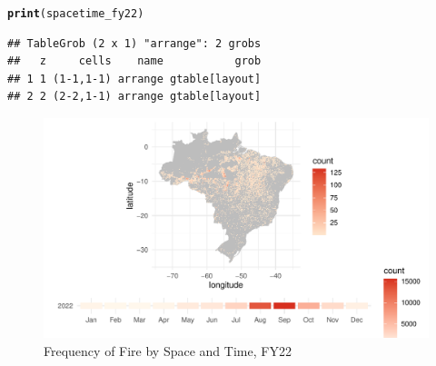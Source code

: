 \documentclass{article}\usepackage[]{graphicx}\usepackage[]{xcolor}
\makeatletter
\def\maxwidth{ %
  \ifdim\Gin@nat@width>\linewidth
    \linewidth
  \else
    \Gin@nat@width
  \fi
}
\newcommand{\hlstd}[1]{\textcolor[rgb]{0.345,0.345,0.345}{#1}}%
\newcommand{\hlkwd}[1]{\textcolor[rgb]{0.737,0.353,0.396}{\textbf{#1}}}%
\newenvironment{kframe}{%
 \def\at@end@of@kframe{}%
 \ifinner\ifhmode%
  \def\at@end@of@kframe{\end{minipage}}%
  \begin{minipage}{\columnwidth}%
 \fi\fi%
 \def\FrameCommand##1{\hskip\@totalleftmargin \hskip-\fboxsep
 \colorbox{shadecolor}{##1}\hskip-\fboxsep
     \hskip-\linewidth \hskip-\@totalleftmargin \hskip\columnwidth}%
 \MakeFramed {\advance\hsize-\width
   \@totalleftmargin\z@ \linewidth\hsize
   \@setminipage}}%
 {\par\unskip\endMakeFramed%
 \at@end@of@kframe}
\newenvironment{knitrout}{}{} %
\makeatother
\begin{document}
\begin{knitrout}
\begin{kframe}
\begin{alltt}
\hlkwd{print}\hlstd{(spacetime_fy22)}
\end{alltt}
\begin{verbatim}
## TableGrob (2 x 1) "arrange": 2 grobs
##   z     cells    name           grob
## 1 1 (1-1,1-1) arrange gtable[layout]
## 2 2 (2-2,1-1) arrange gtable[layout]
\end{verbatim}
\end{kframe}\begin{figure}
\includegraphics[width=\maxwidth]{figure/spacetime-fy22-1} \caption[Frequency of Fire by Space and Time, FY22]{Frequency of Fire by Space and Time, FY22}\label{fig:spacetime-fy22}
\end{figure}

\end{knitrout}
\end{document}
